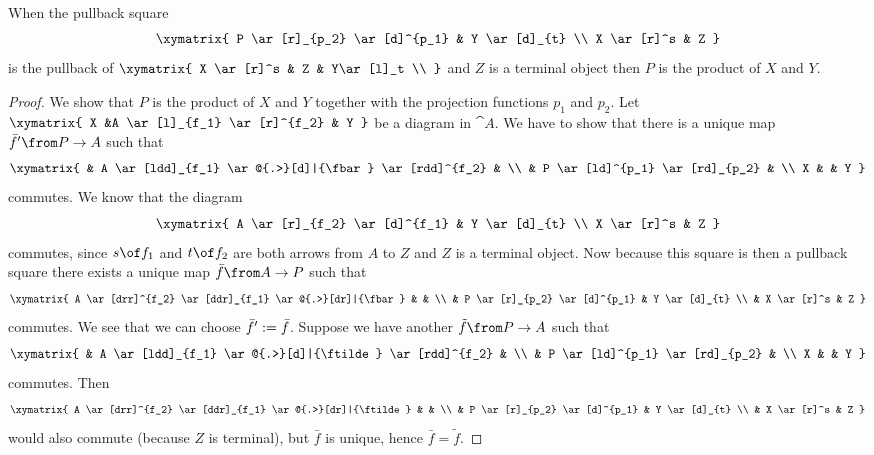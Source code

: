 \begin{lemma}
  \label{ex:pullback:product}
  When the pullback square
  \[ \xymatrix{
    P \ar[r]_{p_2} \ar[d]^{p_1} & Y \ar[d]_{t} \\
    X \ar[r]^s & Z
  } \]
  is the pullback of
  $ \xymatrix{
    X \ar[r]^s & Z & Y\ar[l]_t \\
  } $
  and $Z$ is a terminal object then $P$ is the product of $X$ and $Y$.
\end{lemma}
\begin{proof}
  We show that $P$ is the product of $X$ and $Y$ together with the projection functions $p_1$ and $p_2$.
  Let
  $ \xymatrix{
    X &A \ar[l]_{f_1} \ar[r]^{f_2} & Y
  } $
  be a diagram in $\cat{A}$.
  We have to show that there is a unique map $\fbar' \from P \to A$ such that
  \[ \xymatrix{
    & A \ar[ldd]_{f_1} \ar@{.>}[d]|{\fbar} \ar[rdd]^{f_2} & \\
    & P \ar[ld]^{p_1} \ar[rd]_{p_2} & \\
    X & & Y
  } \]
  commutes. We know that the diagram
  \[ \xymatrix{
    A \ar[r]_{f_2} \ar[d]^{f_1} & Y \ar[d]_{t} \\
    X \ar[r]^s & Z
  } \]
  commutes, since $s \of f_1$ and $t \of f_2$ are both arrows from $A$ to $Z$ and $Z$ is a terminal object.
  Now because this square is then a pullback square there exists a unique map $\fbar \from A \to P$ such that
  \[ \xymatrix{
    A \ar[drr]^{f_2} \ar[ddr]_{f_1} \ar@{.>}[dr]|{\fbar} & & \\
    & P \ar[r]_{p_2} \ar[d]^{p_1} & Y \ar[d]_{t} \\
    & X \ar[r]^s & Z
  } \]
  commutes. We see that we can choose $\bar{f}' := \bar{f}$.
  Suppose we have another $\tilde{f} \from P \to A$ such that
  \[ \xymatrix{
    & A \ar[ldd]_{f_1} \ar@{.>}[d]|{\ftilde} \ar[rdd]^{f_2} & \\
    & P \ar[ld]^{p_1} \ar[rd]_{p_2} & \\
    X & & Y
  } \]
  commutes. Then
  \[ \xymatrix{
    A \ar[drr]^{f_2} \ar[ddr]_{f_1} \ar@{.>}[dr]|{\ftilde} & & \\
    & P \ar[r]_{p_2} \ar[d]^{p_1} & Y \ar[d]_{t} \\
    & X \ar[r]^s & Z
  } \]
  would also commute (because $Z$ is terminal), but $\bar{f}$ is unique, hence $\bar{f} = \tilde{f}$.
\end{proof}


